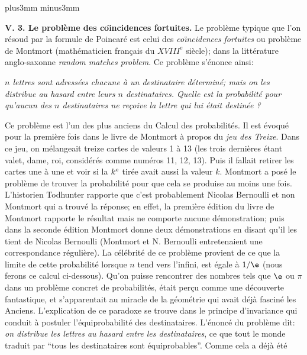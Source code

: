 \vskip6mm plus3mm minus3mm

{\bf V\ata . 3. Le probl\`eme des co{\"\i}ncidences fortuites.}
\medskip
Le probl\`eme typique que l'on r\'esoud par la formule de Poincar\'e est 
celui des {\it co{\"\i}ncidences fortuites} ou probl\`eme de Montmort
(math\'ematicien fran\c{c}ais du $XVIII^e$ si\`ecle); dans la litt\'erature
anglo-saxonne {\it random matches problem}. Ce probl\`eme s'\'enonce 
ainsi: 
\smallskip
{\narrower
{\sl \noindent $n$ lettres  sont adress\'ees chacune \`a un destinataire 
d\'etermin\'e; mais on les distribue au hasard entre leurs $n$ 
destinataires.  Quelle est la probabilit\'e pour qu'aucun des $n$
destinataires ne re\c{c}oive  la lettre qui lui \'etait destin\'ee ?} \par }
\smallskip
Ce probl\`eme est l'un des plus anciens du Calcul des probabilit\'es. 
Il est \'evoqu\'e pour la premi\`ere fois dans le livre de Montmort \`a 
propos du {\it jeu des Treize}.  Dans ce jeu,  on m\'elangeait treize  
cartes de valeurs 1 \`a 13 (les trois derni\`eres \'etant valet, dame,  
roi,  consid\'er\'es comme num\'eros 11, 12, 13).  Puis il fallait retirer 
les cartes une \`a une et voir si la $k^{\rm e}$ tir\'ee avait aussi la 
valeur $k$.  Montmort a pos\'e le probl\`eme de trouver la probabilit\'e 
pour que cela se produise au moins une fois. 
\medskip 
L'historien Todhunter rapporte que c'est probablement Nicolas 
Bernoulli et non Montmort qui a trouv\'e la r\'eponse;  en effet,  la  
premi\`ere \'edition du livre de Montmort rapporte le r\'esultat mais ne 
comporte aucune d\'emonstration;  puis dans la seconde \'edition Montmort 
donne deux d\'emons\-tra\-tions en disant qu'il les tient de Nicolas 
Bernoulli (Montmort et N. Bernoulli entretenaient une correspondance
r\'eguli\`ere). 
\medskip 
La c\'el\'ebrit\'e de ce probl\`eme provient de ce que la limite de cette
probabilit\'e lorsque $n$ tend vers l'infini,  est \'egale \`a $1/\e$ (nous
ferons ce calcul ci-dessous).  Qu'on puisse rencontrer des nombres tels 
que $\e$ ou $\pi$ dans un probl\`eme concret de probabilit\'es,  \'etait 
per\c{c}u comme une d\'ecouverte fantastique,  et s'apparentait au miracle
de la g\'eom\'etrie qui avait d\'ej\`a fascin\'e les Anciens. 
\medskip
L'explication de ce paradoxe se trouve dans le principe d'invariance
qui conduit \`a postuler l'\'equiprobabilit\'e des destinataires.
L'\'enonc\'e du probl\`eme dit:  {\sl on distribue les lettres au hasard
entre les destinataires},  ce que tout le monde traduit par ``tous les
destinataires sont \'equiprobables''.  Comme cela a d\'ej\`a \'et\'e
